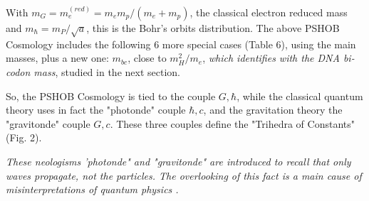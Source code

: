 \documentclass[a4paper,9pt]{article}
\newcounter{row}
\begin{document}
With $m_G = m_e^{(red)} = m_em_p/(m_e+m_p)$, the classical electron reduced mass and $m_{\hbar} = m_P/\sqrt a$, this is the Bohr's orbits distribution. The above PSHOB Cosmology includes the following 6 more special cases (Table 6), using the main masses, plus a new one: $m_{bc}$, close to $m_H^2/m_e$, \textit{which identifies with the DNA bi-codon mass}, studied in the next section.

    
    
        
        
        
         


So, the PSHOB Cosmology is tied to the couple $G,\hbar$, while the classical quantum theory uses in fact the "photonde" couple $\hbar,c$, and the gravitation theory the "gravitonde" couple $G,c$. These three couples define the "Trihedra of Constants"(Fig. 2).

\textit{These neologisms 'photonde" and "gravitonde" are introduced to recall that only waves propagate, not the particles. The overlooking of this fact is a main cause of misinterpretations of quantum physics .}
\end{document}
